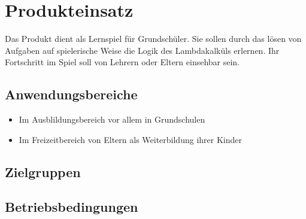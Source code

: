 \section{Produkteinsatz}

Das Produkt dient als Lernspiel für Grundschüler. Sie sollen durch das lösen von Aufgaben auf spielerische Weise die Logik des Lambdakalküls erlernen. Ihr Fortschritt im Spiel soll von Lehrern oder Eltern einsehbar sein.

\subsection{Anwendungsbereiche}
\begin{itemize}
	\item Im Ausblildungsbereich vor allem in Grundschulen
	\item Im Freizeitbereich von Eltern als Weiterbildung ihrer Kinder
\end{itemize}


\subsection{Zielgruppen}

\subsection{Betriebsbedingungen}
